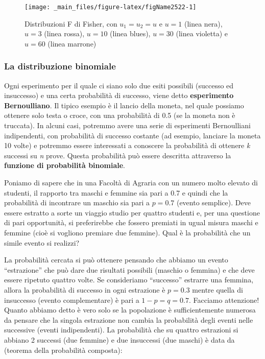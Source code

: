 \documentclass[a4paper,12pt,oneside]{book}
\begin{document}
\begin{figure}

{\centering \texttt{[image: \_main\_files/figure-latex/figName2522-1]} 

}

\caption{Distribuzioni F di Fisher, con $
u_1 = 
u_2 = 
u$ e $
u = 1$ (linea nera), $
u = 3$ (linea rossa), $
u = 10$ (linea blues), $
u = 30$ (linea violetta) e $
u = 60$ (linea marrone)}\label{fig:figName2522}
\end{figure}

\hypertarget{la-distribuzione-binomiale}{%
\subsubsection{La distribuzione binomiale}\label{la-distribuzione-binomiale}}

Ogni esperimento per il quale ci siano solo due esiti possibili (successo ed insuccesso) e una certa probabilità di successo, viene detto \textbf{esperimento Bernoulliano}. Il tipico esempio è il lancio della moneta, nel quale possiamo ottenere solo testa o croce, con una probabilità di 0.5 (se la moneta non è truccata). In alcuni casi, potremmo avere una serie di esperimenti Bernoulliani indipendenti, con probabilità di successo costante (ad esempio, lanciare la moneta 10 volte) e potremmo essere interessati a conoscere la probabilità di ottenere \emph{k} successi su \emph{n} prove. Questa probabilità può essere descritta attraverso la \textbf{funzione di probabilità binomiale}.

Poniamo di sapere che in una Facoltà di Agraria con un numero molto elevato di studenti, il rapporto tra maschi e femmine sia pari a 0.7 e quindi che la probabilità di incontrare un maschio sia pari a \(p = 0.7\) (evento semplice). Deve essere estratto a sorte un viaggio studio per quattro studenti e, per una questione di pari opportunità, si preferirebbe che fossero premiati in ugual misura maschi e femmine (cioè si vogliono premiare due femmine). Qual è la probabilità che un simile evento si realizzi?

La probabilità cercata si può ottenere pensando che abbiamo un evento ``estrazione'' che può dare due risultati possibili (maschio o femmina) e che deve essere ripetuto quattro volte. Se consideriamo ``successo'' estrarre una femmina, allora la probabilità di successo in ogni estrazione è \(p = 0.3\) mentre quella di insuccesso (evento complementare) è pari a \(1 - p = q = 0.7\). Facciamo attenzione! Quanto abbiamo detto è vero solo se la popolazione è sufficientemente numerosa da pensare che la singola estrazione non cambia la probabilità degli eventi nelle successive (eventi indipendenti). La probabilità che su quattro estrazioni si abbiano 2 successi (due femmine) e due insuccessi (due maschi) è data da (teorema della probabilità composta):
\end{document}
